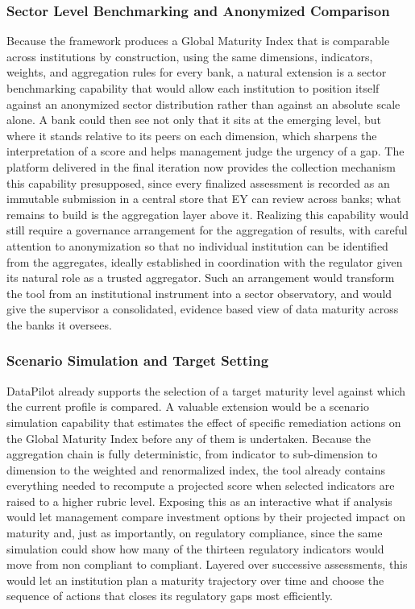 \subsubsection{Sector Level Benchmarking and Anonymized Comparison}

Because the framework produces a Global Maturity Index that is comparable across institutions by construction, using the same dimensions, indicators, weights, and aggregation rules for every bank, a natural extension is a sector benchmarking capability that would allow each institution to position itself against an anonymized sector distribution rather than against an absolute scale alone. A bank could then see not only that it sits at the emerging level, but where it stands relative to its peers on each dimension, which sharpens the interpretation of a score and helps management judge the urgency of a gap. The platform delivered in the final iteration now provides the collection mechanism this capability presupposed, since every finalized assessment is recorded as an immutable submission in a central store that EY can review across banks; what remains to build is the aggregation layer above it. Realizing this capability would still require a governance arrangement for the aggregation of results, with careful attention to anonymization so that no individual institution can be identified from the aggregates, ideally established in coordination with the regulator given its natural role as a trusted aggregator. Such an arrangement would transform the tool from an institutional instrument into a sector observatory, and would give the supervisor a consolidated, evidence based view of data maturity across the banks it oversees.

\subsubsection{Scenario Simulation and Target Setting}

DataPilot already supports the selection of a target maturity level against which the current profile is compared. A valuable extension would be a scenario simulation capability that estimates the effect of specific remediation actions on the Global Maturity Index before any of them is undertaken. Because the aggregation chain is fully deterministic, from indicator to sub-dimension to dimension to the weighted and renormalized index, the tool already contains everything needed to recompute a projected score when selected indicators are raised to a higher rubric level. Exposing this as an interactive what if analysis would let management compare investment options by their projected impact on maturity and, just as importantly, on regulatory compliance, since the same simulation could show how many of the thirteen regulatory indicators would move from non compliant to compliant. Layered over successive assessments, this would let an institution plan a maturity trajectory over time and choose the sequence of actions that closes its regulatory gaps most efficiently.

